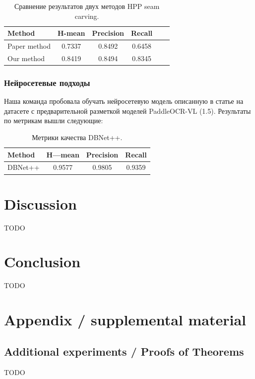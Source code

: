 \documentclass{article}
\begin{document}
\begin{table}[h!]
\centering
\caption{Сравнение результатов двух методов HPP seam carving.}
\label{tab:hpp_seam_comparison}
\begin{tabular}{lccccc}
\hline
\textbf{Method} & \textbf{H-mean} & \textbf{Precision} & \textbf{Recall} \\
\hline
Paper method  & 0.7337 & 0.8492 & 0.6458 \\
Our method & 0.8419 & 0.8494 & 0.8345 \\
\hline
\end{tabular}
\end{table}

\subsubsection{Нейросетевые подходы}

Наша команда пробовала обучать нейросетевую модель описанную в статье \cite{Liao2022} на датасете \cite{potyashin2023hwr200} с предварительной разметкой моделей PaddleOCR-VL (1.5). Результаты по метрикам вышли следующие:

\begin{table}[h!]
\centering
\caption{Метрики качества DBNet++.}
\label{tab:dbnet_metrics}
\begin{tabular}{lccc}
\hline
\textbf{Method} & \textbf{H—mean} & \textbf{Precision} & \textbf{Recall} \\
\hline
DBNet++ & 0.9577 & 0.9805 & 0.9359 \\
\hline
\end{tabular}
\end{table}

\section{Discussion}\label{sec:disc}

TODO

\section{Conclusion}\label{sec:concl}

TODO







\newpage
\appendix
\section{Appendix / supplemental material}\label{app}

\subsection{Additional experiments / Proofs of Theorems}\label{app:exp}

TODO
\end{document}
